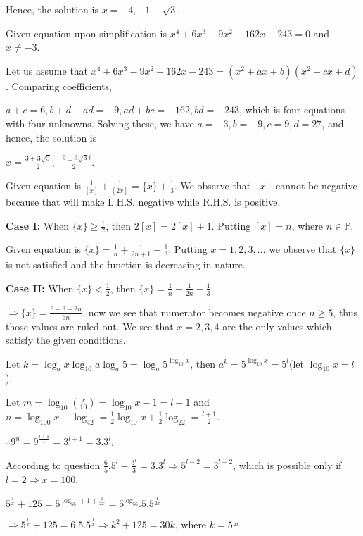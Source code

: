   Hence, the solution is $x = -4, -1 - \sqrt{3}$.
\item Given equation upon simplification is $x^4 + 6x^3 - 9x^2 - 162x - 243 = 0$ and $x\neq -3$.

  Let us assume that $x^4 + 6x^3 - 9x^2 - 162x - 243 = (x^2 + ax + b)(x^2 + cx + d)$. Comparing
  coefficients,

  $a + c = 6, b + d + ad = -9, ad + bc = -162, bd = -243$, which is four equations with four
  unknowns. Solving these, we have $a = -3, b = -9, c = 9, d = 27$, and hence, the solution is

  $x = \frac{3\pm3\sqrt{5}}{2}, \frac{-9\pm3\sqrt{3}i}{2}$.
\item Given equation is $\frac{1}{[x]} + \frac{1}{[2x]} = \{x\} + \frac{1}{3}$. We observe that $[x]$ cannot
  be negative because that will make L.H.S. negative while R.H.S. is positive.

  {\bf Case I:} When $\{x\}\geq\frac{1}{2}$, then $2[x] = 2[x] + 1$. Putting $[x] = n$, where
  $n\in\mathbb{P}$.

  Given equation is $\{x\} = \frac{1}{n} + \frac{1}{2n + 1} - \frac{1}{3}$. Putting $x = 1, 2, 3, \ldots$
  we observe that $\{x\}$ is not satisfied and the function is decreasing in nature.

  {\bf Case II:} When $\{x\} < \frac{1}{2}$, then $\{x\} = \frac{1}{n} + \frac{1}{2n} - \frac{1}{3}$.

  $\Rightarrow \{x\} = \frac{6 + 3 - 2n}{6n}$, now we see that numerator becomes negative once $n \geq 5$,
  thus those values are ruled out. We see that $x = 2, 3, 4$ are the only values which satisfy the given
  conditions.
\item Let $k = \log_ax\log_{10}a\log_a5 = \log_a5^{\log_{10}x}$, then $a^k = 5^{\log_{10}x} = 5^l$(let
  $\log_{10}x = l$).

  Let $m = \log_{10}\left(\frac{x}{10}\right) = \log_{10}x - 1 = l - 1$ and $n = \log_{100}x + \log_42 =
  \frac{1}{2}\log_{10}x + \frac{1}{2}\log_22 = \frac{l + 1}{2}$.

  $\therefore 9^n = 9^{\frac{l + 1}{1}} = 3^{l + 1} = 3.3^l$.

  According to question $\frac{6}{5}.5^l - \frac{3^l}{3} = 3.3^l\Rightarrow 5^{l - 2} = 3^{l - 2}$, which is
  possible only if $l = 2 \Rightarrow x = 100$.
\item $5^{\frac{1}{x}} + 125 = 5^{\log_56 + 1 + \frac{1}{2x}} = 5^{\log_56}.5.5^{\frac{1}{2x}}$

  $\Rightarrow 5^{\frac{1}{x}} + 125 = 6.5.5^{\frac{1}{x}} \Rightarrow k^2 + 125 = 30k$, where $k =
  5^{\frac{1}{2x}}$

